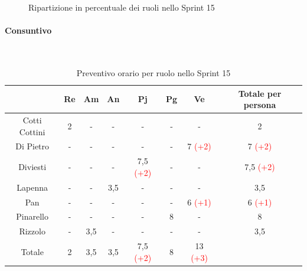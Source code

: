 \documentclass{article}
\begin{document}
                \begin{figure}[H]
                    \centering
                    \caption{Ripartizione in percentuale dei ruoli nello Sprint 15}
                \end{figure}


                \paragraph{Consuntivo}\mbox{}\\
                \begin{table}[H]
                    \centering
                    \begin{tabular}{|c|c|c|c|c|c|c|c|}
                    \hline
                                  & Re  & Am  & An  & Pj  & Pg  & Ve  & Totale per persona \\ \hline
                    Cotti Cottini & 2   & -   & -   & -   & -   & -   & 2                  \\ \hline
                    Di Pietro     & -   & -   & -   & -   & -   & 7 \textcolor{red}{(+2)}   & 7 \textcolor{red}{(+2)}                  \\ \hline
                    Diviesti      & -   & -   & -   & 7,5 \textcolor{red}{(+2)} & -   & -   & 7,5 \textcolor{red}{(+2)}                \\ \hline
                    Lapenna       & -   & -   & 3,5 & -   & -   & -   & 3,5                \\ \hline
                    Pan           & -   & -   & -   & -   & -   & 6 \textcolor{red}{(+1)}   & 6 \textcolor{red}{(+1)}                  \\ \hline
                    Pinarello     & -   & -   & -   & -   & 8  & -   & 8                 \\ \hline
                    Rizzolo       & -   & 3,5 & -   & -   & -   & -   & 3,5                \\ \hline
                    Totale        & 2   & 3,5 & 3,5 & 7,5 \textcolor{red}{(+2)} & 8  & 13 \textcolor{red}{(+3)}  &                    \\ \hline
                    \end{tabular}
                    \caption{Preventivo orario per ruolo nello Sprint 15}  
                \end{table}
\end{document}
